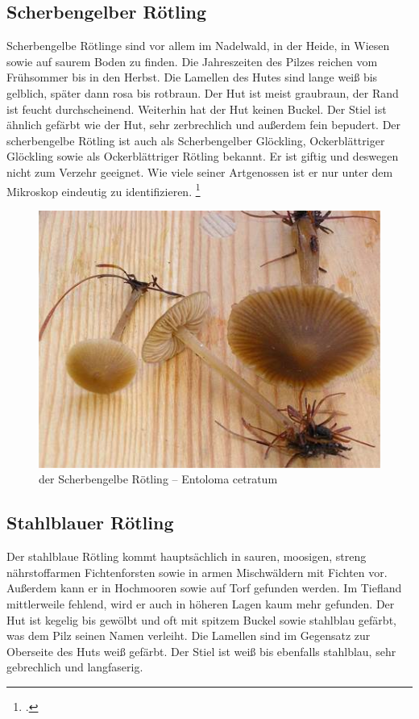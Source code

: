 \documentclass[a4paper,abstracton]{scrreprt}
\begin{document}
\subsection{Scherbengelber Rötling}
Scherbengelbe Rötlinge sind vor allem im Nadelwald, in der Heide, in Wiesen sowie auf saurem Boden zu finden. Die Jahreszeiten des Pilzes reichen vom Frühsommer bis in den Herbst. Die Lamellen des Hutes sind lange weiß bis gelblich, später dann rosa bis rotbraun. Der Hut ist meist graubraun, der Rand ist feucht durchscheinend. Weiterhin hat der Hut keinen Buckel. Der Stiel ist ähnlich gefärbt wie der Hut, sehr zerbrechlich und außerdem fein bepudert.
Der scherbengelbe Rötling ist auch als Scherbengelber Glöckling, Ockerblättriger Glöckling sowie als Ockerblättriger Rötling bekannt. Er ist giftig und deswegen nicht zum Verzehr geeignet. Wie viele seiner Artgenossen ist er nur unter dem Mikroskop eindeutig zu identifizieren.
\footcite{scherbengelb}
\begin{figure}[H]
\centering
\includegraphics[scale=0.6]{scherbengelb}
\caption{der Scherbengelbe Rötling -- Entoloma cetratum }
\label{fig:scherbengelb}
\end{figure}

\subsection{Stahlblauer Rötling}
Der stahlblaue Rötling kommt hauptsächlich in sauren, moosigen, streng nährstoffarmen Fichtenforsten sowie in armen Mischwäldern mit Fichten vor. Außerdem kann er in Hochmooren sowie auf Torf gefunden werden. Im Tiefland mittlerweile fehlend, wird er auch in höheren Lagen kaum mehr gefunden.
Der Hut ist kegelig bis gewölbt und oft mit spitzem Buckel sowie stahlblau gefärbt, was dem Pilz seinen Namen verleiht. Die Lamellen sind im Gegensatz zur Oberseite des Huts weiß gefärbt. Der Stiel ist weiß bis ebenfalls stahlblau, sehr gebrechlich und langfaserig.
\end{document}
